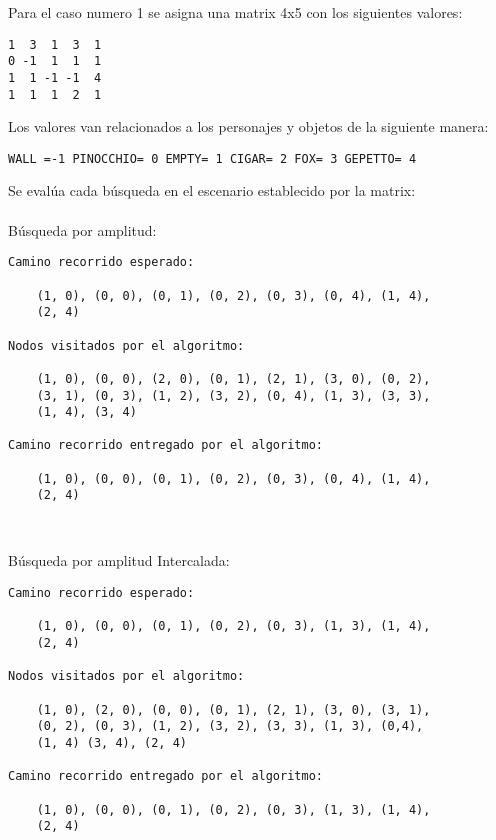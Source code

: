 
Para el caso numero 1 se asigna una matrix 4x5 con los siguientes valores:
\begin{lstlisting}[style=myStyle]
1  3  1  3  1
0 -1  1  1  1
1  1 -1 -1  4
1  1  1  2  1
\end{lstlisting}
Los valores van relacionados a los personajes y objetos de la siguiente manera:
\begin{lstlisting}[style=myStyle]
WALL =-1 PINOCCHIO= 0 EMPTY= 1 CIGAR= 2 FOX= 3 GEPETTO= 4
\end{lstlisting}
Se evalúa cada búsqueda en el escenario establecido por la matrix:\\\\
Búsqueda por amplitud:\\

\begin{lstlisting}[]
Camino recorrido esperado:

    (1, 0), (0, 0), (0, 1), (0, 2), (0, 3), (0, 4), (1, 4), 
    (2, 4)

Nodos visitados por el algoritmo:

    (1, 0), (0, 0), (2, 0), (0, 1), (2, 1), (3, 0), (0, 2), 
    (3, 1), (0, 3), (1, 2), (3, 2), (0, 4), (1, 3), (3, 3),
    (1, 4), (3, 4)

Camino recorrido entregado por el algoritmo:
    
    (1, 0), (0, 0), (0, 1), (0, 2), (0, 3), (0, 4), (1, 4), 
    (2, 4)

    
\end{lstlisting}
\clearpage
Búsqueda por amplitud Intercalada:\\
\begin{lstlisting}[]
Camino recorrido esperado:

    (1, 0), (0, 0), (0, 1), (0, 2), (0, 3), (1, 3), (1, 4), 
    (2, 4)

Nodos visitados por el algoritmo:

    (1, 0), (2, 0), (0, 0), (0, 1), (2, 1), (3, 0), (3, 1), 
    (0, 2), (0, 3), (1, 2), (3, 2), (3, 3), (1, 3), (0,4),
    (1, 4) (3, 4), (2, 4)

Camino recorrido entregado por el algoritmo:
    
    (1, 0), (0, 0), (0, 1), (0, 2), (0, 3), (1, 3), (1, 4), 
    (2, 4)

    
\end{lstlisting}

